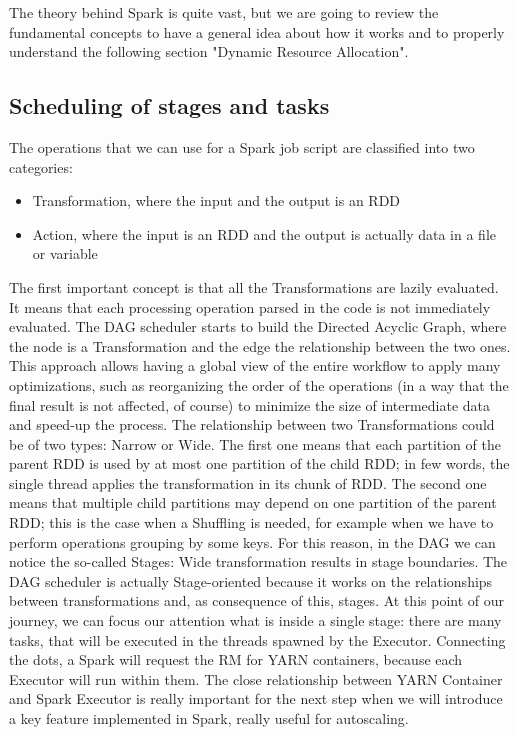 \documentclass[12pt,twoside,cucitura]{toptesi}
\begin{document}
The theory behind Spark is quite vast, but we are going to review the fundamental concepts to have a general idea about how it works and to properly understand the following section "Dynamic Resource Allocation".

\subsection{Scheduling of stages and tasks}
The operations that we can use for a Spark job script are classified into two categories:
\begin{itemize}
  \item Transformation, where the input and the output is an RDD  
  \item Action, where the input is an RDD and the output is actually data in a file or variable
\end{itemize}
The first important concept is that all the Transformations are lazily evaluated. It means that each processing operation parsed in the code is not immediately evaluated. The DAG scheduler starts to build the Directed Acyclic Graph, where the node is a Transformation and the edge the relationship between the two ones. This approach allows having a global view of the entire workflow to apply many optimizations, such as reorganizing the order of the operations (in a way that the final result is not affected, of course) to minimize the size of intermediate data and speed-up the process.
The relationship between two Transformations could be of two types: Narrow or Wide. The first one means that each partition of the parent RDD is used by at most one partition of the child RDD; in few words, the single thread applies the transformation in its chunk of RDD. The second one means that multiple child partitions may depend on one partition of the parent RDD; this is the case when a Shuffling is needed, for example when we have to perform operations grouping by some keys. For this reason, in the DAG we can notice the so-called Stages: Wide transformation results in stage boundaries. The DAG scheduler is actually Stage-oriented because it works on the relationships between transformations and, as consequence of this, stages.
At this point of our journey, we can focus our attention what is inside a single stage: there are many tasks, that will be executed in the threads spawned by the Executor. Connecting the dots, a Spark will request the RM for YARN containers, because each Executor will run within them. The close relationship between YARN Container and Spark Executor is really important for the next step when we will introduce a key feature implemented in Spark, really useful for autoscaling.
\end{document}
